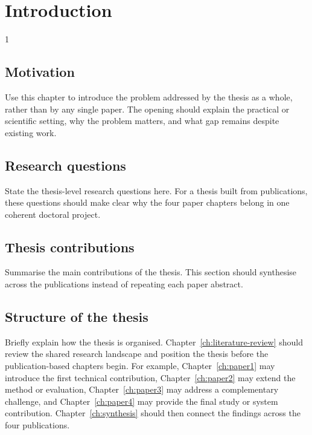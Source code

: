 \doublespacing %

\chapter{Introduction}
\label{ch:introduction}

\begin{spacing}{1} %
\minitoc %
\end{spacing} %
\thesisspacing %

\section{Motivation}

Use this chapter to introduce the problem addressed by the thesis as a whole, rather than by any single paper. The opening should explain the practical or scientific setting, why the problem matters, and what gap remains despite existing work.

\section{Research questions}

State the thesis-level research questions here. For a thesis built from publications, these questions should make clear why the four paper chapters belong in one coherent doctoral project.

\section{Thesis contributions}

Summarise the main contributions of the thesis. This section should synthesise across the publications instead of repeating each paper abstract.

\section{Structure of the thesis}

Briefly explain how the thesis is organised. Chapter~\ref{ch:literature-review} should review the shared research landscape and position the thesis before the publication-based chapters begin. For example, Chapter~\ref{ch:paper1} may introduce the first technical contribution, Chapter~\ref{ch:paper2} may extend the method or evaluation, Chapter~\ref{ch:paper3} may address a complementary challenge, and Chapter~\ref{ch:paper4} may provide the final study or system contribution. Chapter~\ref{ch:synthesis} should then connect the findings across the four publications.
